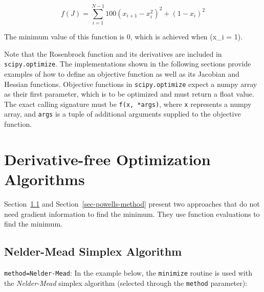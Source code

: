 \documentclass[
  letterpaper,
  DIV=11,
  numbers=noendperiod]{scrreprt}
\begin{document}
\[
f(J) = \sum_{i=1}^{N-1} 100 (x_{i+1} - x_i^2)^2 + (1 - x_i)^2
\]

The minimum value of this function is 0, which is achieved when (x\_i =
1).

Note that the Rosenbrock function and its derivatives are included in
\texttt{scipy.optimize}. The implementations shown in the following
sections provide examples of how to define an objective function as well
as its Jacobian and Hessian functions. Objective functions in
\texttt{scipy.optimize} expect a numpy array as their first parameter,
which is to be optimized and must return a float value. The exact
calling signature must be \texttt{f(x,\ *args)}, where \texttt{x}
represents a numpy array, and \texttt{args} is a tuple of additional
arguments supplied to the objective function.

\hypertarget{derivative-free-optimization-algorithms}{%
\section{Derivative-free Optimization
Algorithms}\label{derivative-free-optimization-algorithms}}

Section~\ref{sec-nelder-mead-simplex-algorithm} and
Section~\ref{sec-powells-method} present two approaches that do not need
gradient information to find the minimum. They use function evaluations
to find the minimum.

\hypertarget{sec-nelder-mead-simplex-algorithm}{%
\subsection{Nelder-Mead Simplex
Algorithm}\label{sec-nelder-mead-simplex-algorithm}}

\texttt{method=\textquotesingle{}Nelder-Mead\textquotesingle{}}: In the
example below, the \texttt{minimize} routine is used with the
\emph{Nelder-Mead} simplex algorithm (selected through the
\texttt{method} parameter):
\end{document}

